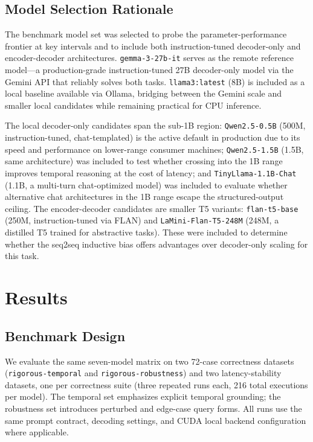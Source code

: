 \documentclass[conference]{IEEEtran}
\begin{document}
\subsection{Model Selection Rationale}

The benchmark model set was selected to probe the parameter-performance frontier at key intervals and to include both instruction-tuned decoder-only and encoder-decoder architectures. \texttt{gemma-3-27b-it} serves as the remote reference model---a production-grade instruction-tuned 27B decoder-only model via the Gemini API that reliably solves both tasks. \texttt{llama3:latest} (8B) is included as a local baseline available via Ollama, bridging between the Gemini scale and smaller local candidates while remaining practical for CPU inference.

The local decoder-only candidates span the sub-1B region: \texttt{Qwen2.5-0.5B} (500M, instruction-tuned, chat-templated) is the active default in production due to its speed and performance on lower-range consumer machines; \texttt{Qwen2.5-1.5B} (1.5B, same architecture) was included to test whether crossing into the 1B range improves temporal reasoning at the cost of latency; and \texttt{TinyLlama-1.1B-Chat} (1.1B, a multi-turn chat-optimized model) was included to evaluate whether alternative chat architectures in the 1B range escape the structured-output ceiling. The encoder-decoder candidates are smaller T5 variants: \texttt{flan-t5-base} (250M, instruction-tuned via FLAN) and \texttt{LaMini-Flan-T5-248M} (248M, a distilled T5 trained for abstractive tasks). These were included to determine whether the seq2seq inductive bias offers advantages over decoder-only scaling for this task.

\section{Results}
\label{sec:results}

\subsection{Benchmark Design}

We evaluate the same seven-model matrix on two 72-case correctness datasets (\texttt{rigorous-temporal} and \texttt{rigorous-robustness}) and two latency-stability datasets, one per correctness suite (three repeated runs each, 216 total executions per model). The temporal set emphasizes explicit temporal grounding; the robustness set introduces perturbed and edge-case query forms. All runs use the same prompt contract, decoding settings, and CUDA local backend configuration where applicable.
\end{document}
